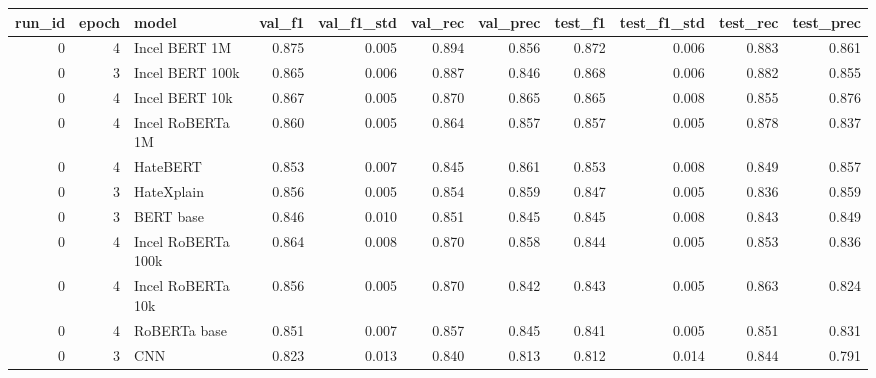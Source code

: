 \begin{tabular}{rrlrrrrrrrr}
\toprule
 run\_id &  epoch &              model &  val\_f1 &  val\_f1\_std &  val\_rec &  val\_prec &  test\_f1 &  test\_f1\_std &  test\_rec &  test\_prec \\
\midrule
      0 &      4 &      Incel BERT 1M &   0.875 &       0.005 &    0.894 &     0.856 &    0.872 &        0.006 &     0.883 &      0.861 \\
      0 &      3 &    Incel BERT 100k &   0.865 &       0.006 &    0.887 &     0.846 &    0.868 &        0.006 &     0.882 &      0.855 \\
      0 &      4 &     Incel BERT 10k &   0.867 &       0.005 &    0.870 &     0.865 &    0.865 &        0.008 &     0.855 &      0.876 \\
      0 &      4 &   Incel RoBERTa 1M &   0.860 &       0.005 &    0.864 &     0.857 &    0.857 &        0.005 &     0.878 &      0.837 \\
      0 &      4 &           HateBERT &   0.853 &       0.007 &    0.845 &     0.861 &    0.853 &        0.008 &     0.849 &      0.857 \\
      0 &      3 &         HateXplain &   0.856 &       0.005 &    0.854 &     0.859 &    0.847 &        0.005 &     0.836 &      0.859 \\
      0 &      3 &          BERT base &   0.846 &       0.010 &    0.851 &     0.845 &    0.845 &        0.008 &     0.843 &      0.849 \\
      0 &      4 & Incel RoBERTa 100k &   0.864 &       0.008 &    0.870 &     0.858 &    0.844 &        0.005 &     0.853 &      0.836 \\
      0 &      4 &  Incel RoBERTa 10k &   0.856 &       0.005 &    0.870 &     0.842 &    0.843 &        0.005 &     0.863 &      0.824 \\
      0 &      4 &       RoBERTa base &   0.851 &       0.007 &    0.857 &     0.845 &    0.841 &        0.005 &     0.851 &      0.831 \\
      0 &      3 &                CNN &   0.823 &       0.013 &    0.840 &     0.813 &    0.812 &        0.014 &     0.844 &      0.791 \\
\bottomrule
\end{tabular}
